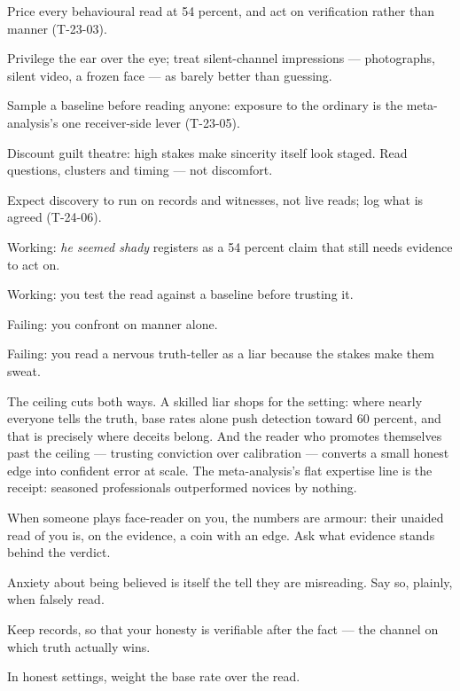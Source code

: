 \begin{application}
  \item Price every behavioural read at 54 percent, and act on verification rather than manner (T-23-03).
  \item Privilege the ear over the eye; treat silent-channel impressions --- photographs, silent video, a frozen face --- as barely better than guessing.
  \item Sample a baseline before reading anyone: exposure to the ordinary is the meta-analysis's one receiver-side lever (T-23-05).
  \item Discount guilt theatre: high stakes make sincerity itself look staged. Read questions, clusters and timing --- not discomfort.
  \item Expect discovery to run on records and witnesses, not live reads; log what is agreed (T-24-06).
\end{application}
\begin{feedback}
  \item Working: \emph{he seemed shady} registers as a 54 percent claim that still needs evidence to act on.
  \item Working: you test the read against a baseline before trusting it.
  \item Failing: you confront on manner alone.
  \item Failing: you read a nervous truth-teller as a liar because the stakes make them sweat.
\end{feedback}
\begin{failure}
The ceiling cuts both ways. A skilled liar shops for the setting: where nearly everyone tells the truth, base rates alone push detection toward 60 percent, and that is precisely where deceits belong. And the reader who promotes themselves past the ceiling --- trusting conviction over calibration --- converts a small honest edge into confident error at scale. The meta-analysis's flat expertise line is the receipt: seasoned professionals outperformed novices by nothing.
\end{failure}
\begin{countermeasures}
  \item When someone plays face-reader on you, the numbers are armour: their unaided read of you is, on the evidence, a coin with an edge. Ask what evidence stands behind the verdict.
  \item Anxiety about being believed is itself the tell they are misreading. Say so, plainly, when falsely read.
  \item Keep records, so that your honesty is verifiable after the fact --- the channel on which truth actually wins.
  \item In honest settings, weight the base rate over the read.
\end{countermeasures}

\seesources
{}
